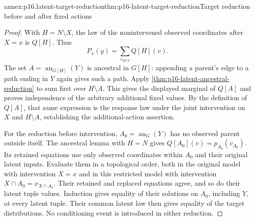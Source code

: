 \begin{annexitem}{annex:p16.latent-target-reduction}{thm:p16-latent-target-reduction}{Target reduction before and after fixed actions}
\begin{proof}
With \(H=N\setminus X\), the law of the nonintervened observed
coordinates after \(X=x\) is \(Q[H]\). Thus
\[
 P_x(y)=\sum_{v_{H\setminus Y}}Q[H](v).
\]
The set \(A=\operatorname{an}_{G[H]}(Y)\) is ancestral in
\(G[H]\): appending a parent's edge to a path ending in \(Y\)
again gives such a path. Apply
\cref{thm:p16-latent-ancestral-reduction} to sum first over
\(H\setminus A\). This gives the displayed marginal of \(Q[A]\)
and proves independence of the arbitrary additional fixed values.
By the definition of \(Q[A]\), that same expression is the
response law under the joint intervention on \(X\) and
\(H\setminus A\), establishing the additional-action assertion.

For the reduction before intervention, \(A_0=\operatorname{an}_G(Y)\)
has no observed parent outside itself. The ancestral lemma with
\(H=N\) gives \(Q[A_0](v)=p_{A_0}(v_{A_0})\). Its retained equations
use only observed coordinates within \(A_0\) and their original
latent inputs. Evaluate them in a topological order, both in the
original model with intervention \(X=x\) and in this restricted
model with intervention \(X\cap A_0=x_{X\cap A_0}\). Their
retained and replaced equations agree, and so do their latent tuple
values. Induction gives equality of their solutions on \(A_0\),
including \(Y\), at every latent tuple. Their common latent law
then gives equality of the target distributions. No conditioning
event is introduced in either reduction.
\end{proof}
\end{annexitem}

